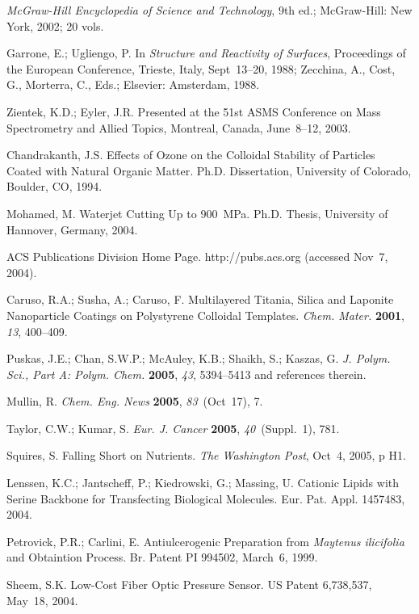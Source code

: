 \documentclass[]{interact}
\theoremstyle{plain}%
\theoremstyle{definition}
\theoremstyle{remark}
\begin{document}
\begin{thebibliography}{99}
\emph{McGraw-Hill Encyclopedia of Science and Technology}, 9th ed.;
  McGraw-Hill: New York, 2002; 20 vols.

Garrone, E.; Ugliengo, P. In \emph{Structure and Reactivity of Surfaces},
  Proceedings of the European Conference, Trieste, Italy, Sept~13--20, 1988;
  Zecchina, A., Cost, G., Morterra, C., Eds.; Elsevier: Amsterdam, 1988.

Zientek, K.D.; Eyler, J.R. Presented at the 51st ASMS Conference on Mass
  Spectrometry and Allied Topics, Montreal, Canada, June~8--12, 2003.

Chandrakanth, J.S. Effects of Ozone on the Colloidal Stability of Particles
  Coated with Natural Organic Matter. Ph.D. Dissertation, University of
  Colorado, Boulder, CO, 1994.

Mohamed, M. Waterjet Cutting Up to 900~MPa. Ph.D. Thesis, University of
  Hannover, Germany, 2004.

ACS Publications Division Home Page. http://pubs.acs.org (accessed Nov~7,
  2004).

Caruso, R.A.; Susha, A.; Caruso, F. Multilayered Titania, Silica and Laponite 
  Nanoparticle Coatings on Polystyrene Colloidal Templates. \emph{Chem. Mater.} 
  \textbf{2001}, \emph{13}, 400--409.

Puskas, J.E.; Chan, S.W.P.; McAuley, K.B.; Shaikh, S.; Kaszas, G. \emph{J.
  Polym. Sci., Part A: Polym. Chem.} \textbf{2005}, \emph{43}, 5394--5413 and
  references therein.

Mullin, R. \emph{Chem. Eng. News} \textbf{2005}, \emph{83}~(Oct~17), 7.

Taylor, C.W.; Kumar, S. \emph{Eur. J. Cancer} \textbf{2005},
  \emph{40}~(Suppl.~1), 781.

Squires, S. Falling Short on Nutrients. \emph{The Washington Post}, Oct~4,
  2005, p H1.

Lenssen, K.C.; Jantscheff, P.; Kiedrowski, G.; Massing, U. Cationic Lipids with
  Serine Backbone for Transfecting Biological Molecules. Eur. Pat. Appl.
  1457483, 2004.

Petrovick, P.R.; Carlini, E. Antiulcerogenic Preparation from \emph{Maytenus
  ilicifolia} and Obtaintion Process. Br. Patent PI 994502, March~6, 1999.

Sheem, S.K. Low-Cost Fiber Optic Pressure Sensor. US Patent 6,738,537,
  May~18, 2004.


\end{thebibliography}
\end{document}
